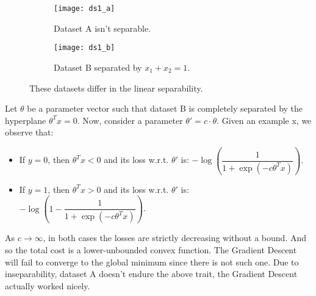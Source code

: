 \begin{answer}
	\begin{figure}[H]
	\centering
	\begin{subfigure}[H]{0.45\linewidth}
		\texttt{[image: ds1\_a]}
		\caption{Dataset A isn't separable.}
	\end{subfigure}
	\begin{subfigure}[H]{0.45\linewidth}
		\texttt{[image: ds1\_b]}
		\caption{Dataset B separated by $ x_1 + x_2 = 1$.}
	\end{subfigure}
	\caption{These datasets differ in the linear separability.}
	\end{figure}
Let $\theta$ be a parameter vector such that dataset B is completely separated 
by the hyperplane $\theta^{T} x = 0$. Now, consider a parameter $\theta' = c 
\cdot \theta$. Given an example x, we observe that:
\begin{itemize}
	\item If $y=0$, then $\theta^{T} x < 0$ and its loss w.r.t. $\theta'$ is: 
	$-\log \left(\dfrac{1}{1 + \exp (-c\theta^T x)} \right)$.
	\item If $y=1$, then $\theta^T x > 0$ and its loss w.r.t. $\theta'$ is: 
	$-\log \left(1 - \dfrac{1}{1 + \exp (-c\theta^T x)} \right)$.
\end{itemize}
As $c \to \infty$, in both cases the losses are strictly decreasing without a 
bound. And so the total cost is a lower-unbounded convex function. The 
Gradient Descent will fail to converge to the global minimum since there is not 
such one. Due to inseparability, dataset A doesn't endure the above trait, the 
Gradient Descent actually worked nicely. \\
\end{answer}
